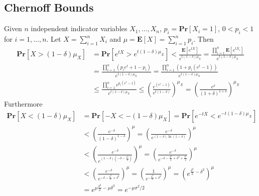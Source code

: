 \documentclass[12pt]{article}
\begin{document}
\subsection{Chernoff Bounds}
Given $n$ independent indicator variables $X_1, \hdots, X_n$, $p_i = \mathbf{Pr}\left[ X_i = 1 \right]$, $0 < p_i < 1$ for $i=1, \hdots, n$. Let $X=\sum_{i=1}^n X_i$ and $\mu = \mathbf{E} \left[ X \right] = \sum_{i=1}^n p_i$. Then
\begin{align*}
\mathbf{Pr}\left[ X > (1-\delta)\mu_X \right]
&= \mathbf{Pr}\left[ e^{tX} > e^{t(1-\delta)\mu_X} \right]
< \frac{\mathbf{E}\left[ e^{tX} \right]}{e^{t(1-\delta)\mu_X}}
= \frac{\prod_{i=1}^n \mathbf{E}\left[ e^{tX_i} \right]}{e^{t(1-\delta)\mu_X}} \\
&= \frac{\prod_{i=1}^n \left( p_i e^t + 1-p_i \right)}{e^{t(1-\delta)\mu_X}}
= \frac{\prod_{i=1}^n \left( 1 + p_i (e^t - 1) \right)}{e^{t(1-\delta)\mu_X}} \\
&\leq \frac{\prod_{i=1}^n e^{p_i (e^t-1)}}{e^{t(1-\delta)\mu_X}}
\leq \left( \frac{e^{(e^t-1)}}{e^{t(1-\delta)}} \right)^{\mu_X}
= \left( \frac{e^{\delta}}{\left( 1 + \delta \right)^{1+\delta}} \right)^{\mu_X}
\end{align*}
Furthermore
\begin{align*}
\mathbf{Pr}\left[ X < (1-\delta)\mu_X \right]
&= \mathbf{Pr}\left[ -X < -(1-\delta)\mu_X \right]
= \mathbf{Pr}\left[ e^{-tX} < e^{-t(1-\delta)\mu_X} \right] \\
&< \left( \frac{e^{-\delta}}{\left( 1-\delta \right)^{1-\delta}} \right)^\mu
= \left( \frac{e^{-\delta}}{e^{\left( 1-\delta \right) \ln (1-\delta)}} \right)^\mu \\
&< \left( \frac{e^{-\delta}}{e^{\left( 1-\delta \right)\left( -\delta - \frac{\delta^2}{2} \right)}} \right)^\mu
=  \left( \frac{e^{-\delta}}{e^{-\delta - \frac{\delta^2}{2} + \delta^2 + \frac{\delta^3}{2}}  } \right)^\mu \\
&<  \left( \frac{e^{-\delta}}{e^{-\delta - \frac{\delta^2}{2} + \delta^2}  } \right)^\mu = \left( \frac{1}{e^{-\frac{\delta^2}{2} + \delta^2}  } \right)^\mu
= \left( e^{\frac{\delta^2}{2} - \delta^2} \right)^\mu \\
&= e^{\mu\frac{\delta^2}{2} - \mu\delta^2} = e^{-\mu\sigma^2/2}
\end{align*}
\end{document}
